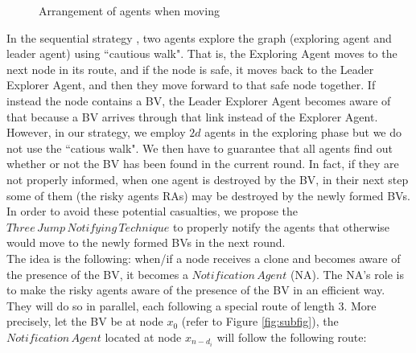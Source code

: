 \begin{figure} [H]
  \centering 
  \hspace{1in} 
  \caption{Arrangement of agents when moving} 
  \label{fig:subfig1} %
\end{figure}

In the sequential strategy \cite{alotaibi},  two agents explore the graph (exploring agent and leader agent)  using  ``cautious walk". That is, the Exploring Agent moves to the next node in its route, and if the node is safe, it moves back to the Leader Explorer Agent, and then they move forward to that safe node together. If instead the node contains a BV, the Leader Explorer Agent becomes aware of that because a BV arrives through that link instead of the Explorer Agent. 
However, in our strategy, we employ $2d$ agents in the exploring phase but we do not use the ``catious walk". We then have to guarantee that   all agents find out whether or not the BV has been found in the current round. In fact, if they are not properly informed, when one agent is destroyed by the BV, in their next step some of them (the risky agents RAs) may be destroyed by the newly formed BVs. In order to avoid these potential casualties, we propose the $Three\,Jump\,Notifying\,Technique$ to properly notify the agents that otherwise would move to the newly formed BVs in the next round.\\

The idea is the following: when/if a node receives a clone and becomes aware of the presence of the BV,  it becomes a  $Notification\,Agent$ (NA). The NA's role is to make the risky agents aware of the presence of the BV in an efficient way. They will do so in parallel, each following  a special  route of length 3.  More precisely, let the BV be at node $x_0$ (refer to Figure \ref{fig:subfig}), the $Notification\,Agent$ located at node $x_{n-d_i}$ will follow the following route:

